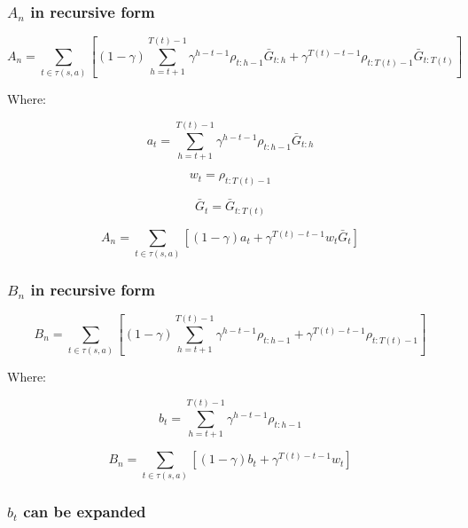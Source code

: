 \documentclass[11pt]{article}
\begin{document}
    \subsubsection*{$A_n$ in recursive form}

    \begin{equation}
        A_n = \sum_{t \in \tau(s, a) } [ (1-\gamma) \sum_{h=t+1}^{T(t)-1} \gamma^{h-t-1} \rho_{t:h-1} \bar{G}_{t:h} + \gamma^{T(t)-t-1} \rho_{t:T(t)-1} \bar{G}_{t:T(t)} ]
    \end{equation}

    Where:

    \begin{equation}
        a_t = \sum_{h=t+1}^{T(t)-1} \gamma^{h-t-1} \rho_{t:h-1} \bar{G}_{t:h}
    \end{equation}

    \begin{equation}
        w_t = \rho_{t:T(t)-1}
    \end{equation}

    \begin{equation}
        \bar{G}_t = \bar{G}_{t:T(t)}
    \end{equation}

    \begin{equation}
        A_n = \sum_{t \in \tau(s, a) } [ (1-\gamma) a_t + \gamma^{T(t)-t-1} w_{t} \bar{G}_t ]
    \end{equation}

    \subsubsection*{$ B_n$ in recursive form}

    \begin{equation}
        B_n =  \sum_{t \in \tau(s,a) } [ (1-\gamma) \sum_{h=t+1}^{T(t)-1} \gamma^{h-t-1} \rho_{t:h-1} + \gamma^{T(t)-t-1} \rho_{t:T(t)-1} ]
    \end{equation}

    Where:

    \begin{equation}
        b_t = \sum_{h=t+1}^{T(t)-1} \gamma^{h-t-1} \rho_{t:h-1}
    \end{equation}

    \begin{equation}
        B_n =  \sum_{t \in \tau(s,a) } [ (1-\gamma) b_t + \gamma^{T(t)-t-1} w_{t} ]
    \end{equation}

    \subsubsection*{$b_t$ can be expanded}
\end{document}
